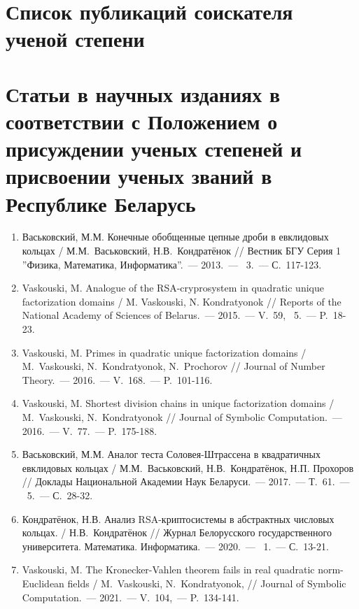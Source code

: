 \documentclass[_00_dissertation.tex]{subfiles}
\begin{document}
\newpage
\section*{Список публикаций соискателя ученой степени}

\renewcommand{\labelenumi}{\arabic{enumi}--A}
\renewcommand{\theenumi}{\arabic{enumi}--A}

\vspace{-4ex}
\section*{\fontsize{14}{15}\selectfont Статьи в научных изданиях в соответствии с Положением о присуждении ученых степеней и присвоении ученых званий в Республике Беларусь}
\vspace{-4ex}

\begin{enumerate}

    \item \label{source:Vestnik_BSU_2013}
    Васьковский, М.М. Конечные обобщенные цепные дроби в евклидовых кольцах / М.М.~Васьковский, Н.В.~Кондратёнок // Вестник БГУ Серия 1 ''Физика, Математика, Информатика''.~--- 2013.~--- \textnumero~3.~--- С.~117-123.

    \item \label{source:NANB_2015}
    Vaskouski, M. Analogue of the RSA-cryprosystem in quadratic unique factorization domains / M. Vaskouski, N. Kondratyonok // Reports of the National Academy of Sciences of Belarus.~--- 2015.~--- V.~59, \textnumero~5.~--- P.~18-23.

    \item \label{source:JNT_2016}
    Vaskouski, M. Primes in quadratic unique factorization domains / M.~Vaskouski, N.~Kondratyonok, N.~Prochorov // Journal of Number Theory.~--- 2016.~--- V.~168.~--- P.~101-116.

    \item \label{source:JSC_2016}
    Vaskouski, M. Shortest division chains in unique factorization domains / M.~Vaskouski, N.~Kondratyonok // Journal of Symbolic Computation.~--- 2016.~--- V.~77.~--- P.~175-188.

    \item \label{source:NANB_2017}
    Васьковский, М.М. Аналог теста Соловея-Штрассена в квадратичных евклидовых кольцах / М.М.~Васьковский, Н.В.~Кондратёнок, Н.П. Прохоров // Доклады Национальной Академии Наук Беларуси.~--- 2017.~--- Т.~61.~--- \textnumero~5.~--- С.~28-32.

    \item \label{source:BSU_Journal_2020}
    Кондратёнок, Н.В. Анализ RSA-криптосистемы в абстрактных числовых кольцах. / Н.В.~Кондратёнок // Журнал Белорусского государственного университета. Математика. Информатика.~--- 2020.~--- \textnumero~1.~--- С.~13-21.

    \item \label{source:JSC_2021}
    Vaskouski, M. The Kronecker-Vahlen theorem fails in real quadratic norm-Euclidean fields / M.~Vaskouski, N.~Kondratyonok, // Journal of Symbolic Computation.~--- 2021.~--- V.~104,~--- P.~134-141.
\end{enumerate}
\end{document}
